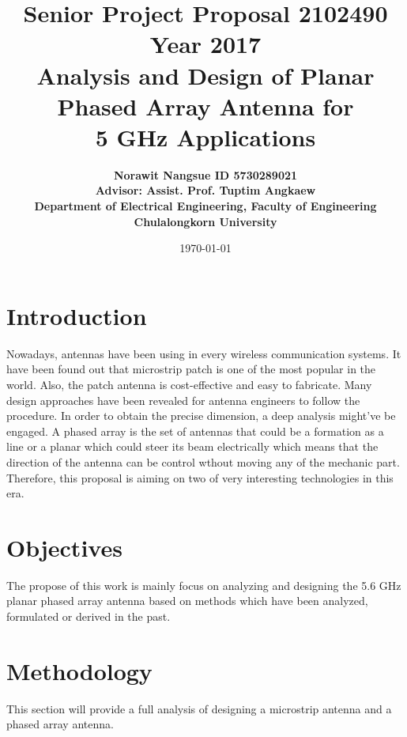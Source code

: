 \documentclass[11pt,a4paper]{article}
\title{
  \textbf{Senior Project Proposal 2102490 Year 2017}  \\[2ex]
  Analysis and Design of Planar Phased Array Antenna for \\[1ex]
  5 GHz Applications
}
\author{\textbf{Norawit Nangsue ID 5730289021} \\[1ex]
\textbf{Advisor: Assist. Prof. Tuptim Angkaew} \\[1ex]
\textbf{Department of Electrical Engineering, Faculty of Engineering} \\[1ex]
\textbf{Chulalongkorn University}
}
\date{\today}
\begin{document}
  \maketitle
  \tableofcontents
  \newpage
  \section{Introduction}
    \indent Nowadays, antennas have been using in every wireless communication systems. It have been found out that microstrip patch is one of the most popular\cite{AkS} in the world. Also, the patch antenna is cost-effective and easy to fabricate\cite{AtT}. Many design approaches have been revealed for antenna engineers to follow the procedure. In order to obtain the precise dimension, a deep analysis might've be engaged.
    \indent A phased array is the set of antennas that could be a formation as a line or a planar which could steer its beam electrically\cite{CoB:05} which means that the direction of the antenna can be control wthout moving any of the mechanic part. Therefore, this proposal is aiming on two of very interesting technologies in this era.

  \section{Objectives}
    \indent The propose of this work is mainly focus on analyzing and designing the 5.6 GHz planar phased array antenna based on methods which have been analyzed, formulated or derived in the past. 

  \section{Methodology}
    \indent This section will provide a full analysis of designing a microstrip antenna and a phased array antenna.
\end{document}
